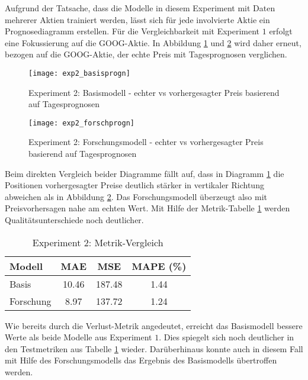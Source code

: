 Aufgrund der Tatsache, dass die Modelle in diesem Experiment mit Daten mehrerer Aktien trainiert werden, lässt sich für jede involvierte Aktie ein Prognosediagramm erstellen. Für die Vergleichbarkeit mit Experiment $1$ erfolgt eine Fokussierung auf die GOOG-Aktie.
In Abbildung \ref{fig:exp2_basisprogn} und \ref{fig:exp2_forschprogn} wird daher erneut, bezogen auf die GOOG-Aktie, der echte Preis mit Tagesprognosen verglichen.
\begin{figure}[H]
	\texttt{[image: exp2\_basisprogn]}
	\caption{Experiment 2: Basismodell - echter vs vorhergesagter Preis basierend auf Tagesprognosen}
	\label{fig:exp2_basisprogn}
\end{figure}
\begin{figure}[H]
	\texttt{[image: exp2\_forschprogn]}
	\caption{Experiment 2: Forschungsmodell - echter vs vorhergesagter Preis basierend auf Tagesprognosen}
	\label{fig:exp2_forschprogn}
\end{figure}
Beim direkten Vergleich beider Diagramme fällt auf, dass in Diagramm \ref{fig:exp2_basisprogn} die Positionen vorhergesagter Preise deutlich stärker in vertikaler Richtung abweichen als in Abbildung \ref{fig:exp2_forschprogn}. Das Forschungsmodell überzeugt also mit Preisvorhersagen nahe am echten Wert.
Mit Hilfe der Metrik-Tabelle \ref{tbl:exp2_model_metrics} werden Qualitätsunterschiede noch deutlicher.
\begin{table}[H]
	\centering
	\caption{Experiment 2: Metrik-Vergleich}
	\label{tbl:exp2_model_metrics}
	\begin{tabular}{lccc}
		\hline
		\textbf{Modell} & \textbf{MAE} & \textbf{MSE} & \textbf{MAPE (\%)} \\
		\hline
		Basis & 10.46 & 187.48 & 1.44 \\
		Forschung & 8.97 & 137.72 & 1.24 \\
		\hline
	\end{tabular}
\end{table}
Wie bereits durch die Verlust-Metrik angedeutet, erreicht das Basismodell bessere Werte als beide Modelle aus Experiment $1$. Dies spiegelt sich noch deutlicher in den Testmetriken aus Tabelle \ref{tbl:exp2_model_metrics} wieder. Darüberhinaus konnte auch in diesem Fall mit Hilfe des Forschungsmodells das Ergebnis des Basismodells übertroffen werden.

